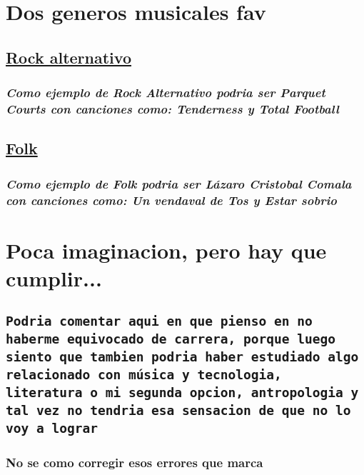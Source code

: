 \documentclass{article}
\begin{document}
   
   
  \section{ \bf {Dos generos musicales fav}}
     \subsection{\underline {\Huge {Rock alternativo}}}
       \subsubsection{}
        \subsubsection{\bf {\emph {Como ejemplo de Rock Alternativo podria ser Parquet Courts con canciones como: Tenderness y Total Football}}}
        
      \subsection{\underline {\Huge {Folk}}}
       \subsubsection{}
        \subsubsection{\bf {\emph {Como ejemplo de Folk podria ser L\'azaro Cristobal Comala con canciones como: Un vendaval de Tos y Estar sobrio}}}
     
   \section{\Large {Poca imaginacion, pero hay que cumplir...}}
        \subsection{\tt{Podria comentar aqui en que pienso en no haberme equivocado de carrera, porque luego siento que tambien podria haber estudiado algo relacionado con m\'usica y tecnologia, literatura o mi segunda opcion, antropologia y tal vez no tendria esa sensacion de que no lo voy a lograr}}
         \subsubsection{\small{No se como corregir esos errores que marca}}
\end{document}
